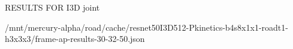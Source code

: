 

RESULTS FOR I3D joint

/mnt/mercury-alpha/road/cache/resnet50I3D512-Pkinetics-b4s8x1x1-roadt1-h3x3x3/frame-ap-results-30-32-50.json